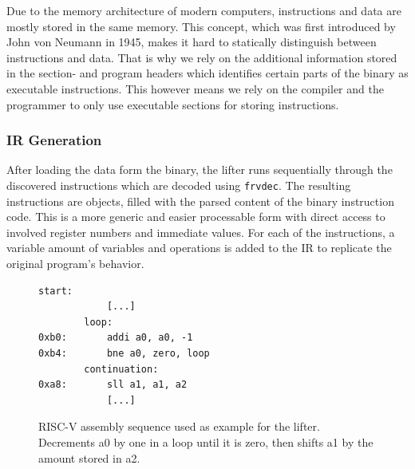 \documentclass[course=eragp]{aspdoc}
\begin{document}
\par

Due to the memory architecture of modern computers, instructions and data are mostly stored in the same
memory. This concept, which was first introduced by John von Neumann in 1945\cite{vna}, makes it
hard to statically distinguish between instructions and data. That is why we rely on the additional
information stored in the section- and program headers which identifies certain parts of the binary
as executable instructions. This however means we rely on the compiler and the programmer to only
use executable sections for storing instructions.

\subsubsection{IR Generation}

After loading the data form the binary, the lifter runs sequentially through the discovered
instructions which are decoded using \texttt{frvdec}\cite{frvdec}. The resulting instructions are objects,
filled with the parsed content of the binary instruction code. This is a
more generic and easier processable form with direct access to involved register numbers and
immediate values. For each of the instructions, a variable amount of variables and operations is added to
the IR to replicate the original program's behavior.

\begin{figure}[H]
    \centering
    \begin{lstlisting}[language={[RISC-V]Assembler}]
        start:
            [...]
        loop:
0xb0:       addi a0, a0, -1
0xb4:       bne a0, zero, loop
        continuation:
0xa8:       sll a1, a1, a2
            [...]
    \end{lstlisting}
    \caption{RISC-V assembly sequence used as example for the lifter. Decrements a0 by one in a loop until it is zero,
             then shifts a1 by the amount stored in a2.}
    \label{fig:lifting_example_riscv}
\end{figure}
\end{document}
